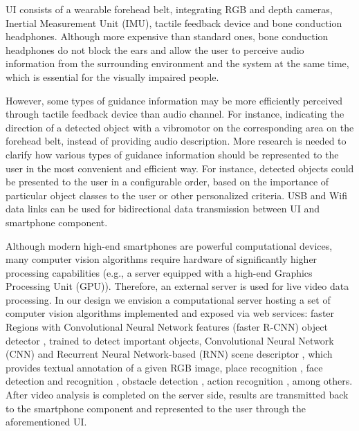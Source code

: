 \documentclass[10pt,conference,compsocconf]{IEEEtran}
\begin{document}

UI consists of a wearable forehead belt, integrating RGB and depth cameras, Inertial Measurement Unit (IMU), tactile feedback device and bone conduction headphones. Although more expensive than standard ones, bone conduction headphones do not block the ears and allow the user to perceive audio information from the surrounding environment and the system at the same time, which is essential for the visually impaired people. 


However, some types of guidance information may be more efficiently perceived through tactile feedback device than audio channel. For instance, indicating the direction of a detected object with a vibromotor on the corresponding area on the forehead belt, instead of providing audio description. More research is needed to clarify how various types of guidance information should be represented to the user in the most convenient and efficient way. For instance, detected objects could be presented to the user in a configurable order, based on the importance of particular object classes to the user or other personalized criteria. USB and Wifi data links can be used for bidirectional data transmission between UI and smartphone component.



Although modern high-end smartphones are powerful computational devices, many computer vision algorithms  require hardware of significantly higher processing capabilities (e.g., a server equipped with a high-end Graphics Processing Unit (GPU)). Therefore, an external server is used for live video data processing. In our design we envision a computational server hosting a set of computer vision algorithms implemented and exposed via web services: faster Regions with Convolutional Neural Network features (faster R-CNN) object detector \cite{Ren}, trained to detect important objects, Convolutional Neural Network (CNN) and Recurrent Neural Network-based (RNN) scene descriptor \cite{Liu}, which provides textual annotation of a given RGB image, place recognition \cite{Ohn-Bar}, face detection and recognition \cite{Amos}, obstacle detection \cite{Laina}, action recognition \cite{Valor}, among others. After video analysis is completed on the server side, results are transmitted back to the smartphone component and represented to the user through the aforementioned UI.
\end{document}
